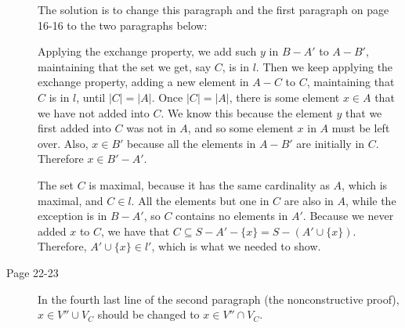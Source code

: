 \documentclass[a4paper, fleqn]{article}
\begin{document}
\begin{description}
The solution is to change this paragraph and the first paragraph on
page 16-16 to the two paragraphs below:

Applying the exchange property, we add such $y$ in $B-A'$ to $A-B'$,
maintaining that the set we get, say $C$, is in $l$. Then we keep
applying the exchange property, adding a new element in $A-C$ to $C$,
maintaining that $C$ is in $l$, until $|C|=|A|$. Once $|C|=|A|$, there
is some element $x \in A$ that we have not added into $C$. We know
this because the element $y$ that we first added into $C$ was not in
$A$, and so some element $x$ in $A$ must be left over. Also, $x \in
B'$ because all the elements in $A-B'$ are initially in $C$. Therefore
$x \in B'-A'$.

The set $C$ is maximal, because it has the same cardinality as $A$,
which is maximal, and $C \in l$. All the elements but one in $C$ are
also in $A$, while the exception is in $B-A'$, so $C$ contains no
elements in $A'$. Because we never added $x$ to $C$, we have that $C
\subseteq S - A' - \{x\} = S - (A' \cup \{x\})$. Therefore, $A' \cup
\{x\} \in l'$, which is what we needed to show.

\item[Page 22-23]

In the fourth last line of the second paragraph (the nonconstructive proof), $x \in V'' \cup V_C$ should be changed to $x \in V'' \cap V_C$.

\end{description}
\end{document}
